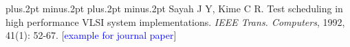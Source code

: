 \documentclass[twoside]{article}
\begin{document}
\begin{multicols}{2}
\vspace{2mm}

 

\begin{thebibliography}{99}
\footnotesize
\itemsep=-3pt plus.2pt minus.2pt
\baselineskip=13pt plus.2pt minus.2pt
Sayah J Y, Kime C R. Test scheduling in high performance VLSI system implementations. {\it IEEE Trans. Computers}, 1992, 41(1): 52-67.  [\textcolor{blue}{example for journal paper}]


\end{thebibliography}

\label{last-page}
\end{multicols}
\end{document}
